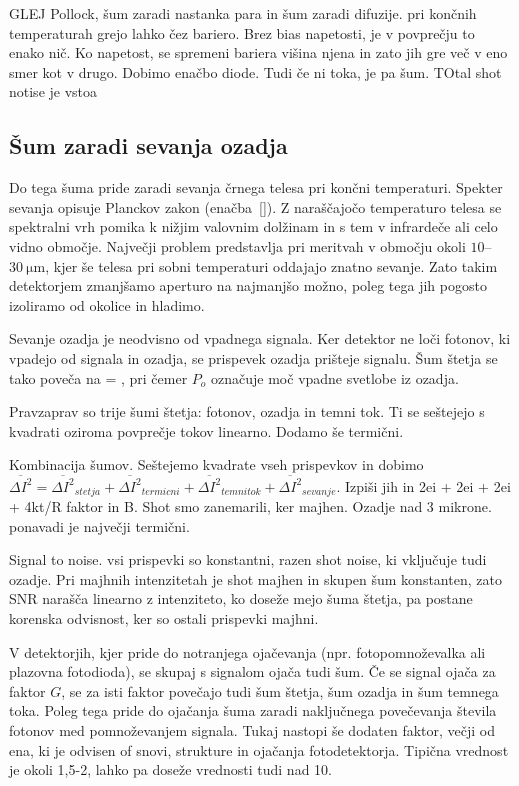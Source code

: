 GLEJ Pollock, šum zaradi nastanka para in šum zaradi difuzije. pri končnih temperaturah
grejo lahko čez bariero. Brez bias napetosti, je v povprečju to enako nič. Ko napetost,
se spremeni bariera višina njena  in zato jih gre več v eno smer kot v drugo. Dobimo enačbo diode.
Tudi če ni toka, je pa šum. TOtal shot notise je vstoa 

\subsection*{Šum zaradi sevanja ozadja}
Do tega šuma pride zaradi sevanja črnega telesa pri končni temperaturi. Spekter sevanja
opisuje Planckov zakon (enačba~\ref{}). Z naraščajočo temperaturo telesa se 
spektralni vrh pomika k nižjim valovnim dolžinam in s tem v infrardeče ali celo vidno območje.
Največji problem predstavlja pri meritvah v območju okoli $10$--$30~\si{\micro\meter}$, 
kjer še telesa pri sobni temperaturi oddajajo znatno sevanje. Zato takim 
detektorjem zmanjšamo aperturo na najmanjšo možno, poleg tega jih pogosto
izoliramo od okolice in hladimo. 

Sevanje ozadja je neodvisno od vpadnega signala. Ker detektor ne loči fotonov, ki 
vpadejo od signala in ozadja, se prispevek ozadja prišteje signalu. Šum štetja se tako
poveča na
\beq
{} = ,
\eeq
pri čemer $P_o$ označuje moč vpadne svetlobe iz ozadja.

Pravzaprav so trije šumi štetja: fotonov, ozadja in temni tok. Ti se seštejejo s kvadrati
oziroma povprečje tokov linearno. Dodamo še termični. 


Kombinacija šumov. Seštejemo kvadrate vseh prispevkov in dobimo
$\overline{\Delta I^2} = \overline{\Delta I^2}_{stetja} + \overline{\Delta I^2}_{termicni}
+ \overline{\Delta I^2}_{temni tok} + \overline{\Delta I^2}_{sevanje}$.
Izpiši jih in 2ei + 2ei + 2ei + 4kt/R faktor in B. Shot smo zanemarili, ker majhen. 
Ozadje nad 3 mikrone. ponavadi je največji termični. 

Signal to noise. vsi prispevki so konstantni, razen shot noise, ki vključuje tudi ozadje. 
Pri majhnih intenzitetah je shot majhen in skupen šum konstanten, zato SNR narašča
linearno z intenziteto, ko doseže mejo šuma štetja, pa postane korenska odvisnost, ker 
so ostali prispevki majhni. 

\begin{remark}
 V detektorjih, kjer pride do notranjega ojačevanja (npr. fotopomnoževalka ali plazovna fotodioda), 
 se skupaj s signalom ojača tudi šum. Če se signal ojača za faktor $G$, se za isti faktor
 povečajo tudi šum štetja, šum ozadja in šum temnega toka. Poleg tega pride do ojačanja šuma
 zaradi naključnega povečevanja števila fotonov med pomnoževanjem signala. Tukaj nastopi
 še dodaten faktor, večji od ena, ki je odvisen of snovi, strukture in ojačanja fotodetektorja. 
 Tipična vrednost je okoli 1,5-2, lahko pa doseže vrednosti tudi nad 10.
\end{remark}

